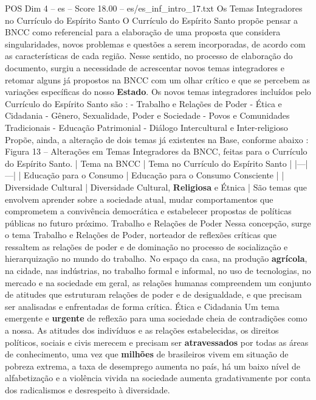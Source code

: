 \begin{textsample}{POS Dim 4 – es – Score 18.00 – es/es\_inf\_intro\_17.txt}  \label{ex:f4_pos_073}
Os Temas Integradores no Currículo do Espírito Santo O Currículo do Espírito Santo propõe pensar a BNCC como referencial para a elaboração de uma proposta que considera singularidades, novos problemas e questões a serem incorporadas, de acordo com as características de cada região.
Nesse sentido, no processo de elaboração do documento, surgiu a necessidade de acrescentar novos temas integradores e retomar alguns já propostos na BNCC com um olhar crítico e que se percebem as variações específicas do nosso \textbf{Estado}.
Os novos temas integradores incluídos pelo Currículo do Espírito Santo são : - Trabalho e Relações de Poder - Ética e Cidadania - Gênero, Sexualidade, Poder e Sociedade - Povos e Comunidades Tradicionais - Educação Patrimonial - Diálogo Intercultural e Inter-religioso Propõe, ainda, a alteração de dois temas já existentes na Base, conforme abaixo : Figura 13 – Alterações em Temas Integradores da BNCC, feitas para o Currículo do Espírito Santo. | Tema na BNCC | Tema no Currículo do Espírito Santo | |---|---| | Educação para o Consumo | Educação para o Consumo Consciente | | Diversidade Cultural | Diversidade Cultural, \textbf{Religiosa} e Étnica | São temas que envolvem aprender sobre a sociedade atual, mudar comportamentos que comprometem a convivência democrática e estabelecer propostas de políticas públicas no futuro próximo.
Trabalho e Relações de Poder Nessa concepção, surge o tema Trabalho e Relações de Poder, norteador de reflexões críticas que ressaltem as relações de poder e de dominação no processo de socialização e hierarquização no mundo do trabalho.
No espaço da casa, na produção \textbf{agrícola}, na cidade, nas indústrias, no trabalho formal e informal, no uso de tecnologias, no mercado e na sociedade em geral, as relações humanas compreendem um conjunto de atitudes que estruturam relações de poder e de desigualdade, e que precisam ser analisadas e enfrentadas de forma crítica.
Ética e Cidadania Um tema emergente e \textbf{urgente} de reflexão para uma sociedade cheia de contradições como a nossa.
As atitudes dos indivíduos e as relações estabelecidas, os direitos políticos, sociais e civis merecem e precisam ser \textbf{atravessados} por todas as áreas de conhecimento, uma vez que \textbf{milhões} de brasileiros vivem em situação de pobreza extrema, a taxa de desemprego aumenta no país, há um baixo nível de alfabetização e a violência vivida na sociedade aumenta gradativamente por conta dos radicalismos e desrespeito à diversidade.

\end{textsample}
